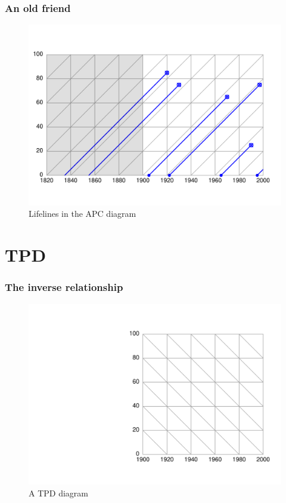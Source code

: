 \documentclass[20pt]{beamer}
\begin{document}
\begin{frame}
\frametitle{An old friend}
\begin{figure}[b]
    \centering
    \includegraphics[scale=.7]{Figures/LabPres/APC2.pdf}
    \caption{Lifelines in the APC diagram}
\end{figure} 
\end{frame}

\section{TPD}
\begin{frame}
\frametitle{The inverse relationship}
\begin{figure}[b]
    \centering
    \includegraphics[scale=.7]{Figures/LabPres/TPD1.pdf}
    \caption{A TPD diagram}
\end{figure} 
\end{frame}
\end{document}
